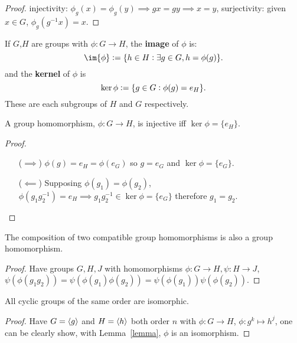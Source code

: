 \documentclass[../Year1.tex]{subfiles}
\begin{document}
\begin{proof}
    injectivity: $\phi_g(x)=\phi_g(y)\implies gx=gy \implies x=y$, \qquad surjectivity: given $x\in G$, $\phi_g(g^{-1}x)=x$.
\end{proof}

\begin{definition}
    If $G$,$H$ are groups with $\phi:G\rightarrow H$, the \textbf{image} of $\phi$ is: \[
        \im{\phi} := \{h\in H:\exists g\in G, h = \phi(g)\}
    \textcolor{black}{.}
    \] and the \textbf{kernel} of $\phi$ is \[
        \ker{\phi} := \{g\in G: \phi(g)=e_H\}
    \textcolor{black}{.}
    \]
    These are each subgroups of $H$ and $G$ respectively.
\end{definition}

\begin{lemma}
    A group homomorphism, $\phi:G\rightarrow H$, is injective iff $\ker\phi=\{e_H\}$.
\end{lemma}

\begin{proof}
    \begin{itemize}
        \item[($\implies$)]$\phi(g)=e_H=\phi(e_G)$ so $g=e_G$ and $\ker\phi=\{e_G\}$.
        \item[($\impliedby$)] Supposing $\phi(g_1)=\phi(g_2)$, $\phi(g_1g_2^{-1})=e_H\implies g_1g_2^{-1}\in\ker\phi = \{e_G\}$ therefore $g_1=g_2$. \vspace{-15pt}
    \end{itemize}
\end{proof}

\begin{theorem}
    The composition of two compatible group homomorphisms is also a group homomorphism.
\end{theorem}

\begin{proof}
    Have groups $G,H,J$ with homomorphisms $\phi:G\rightarrow H, \psi:H\rightarrow J$, $\psi(\phi(g_1g_2))=\psi(\phi(g_1)\phi(g_2))=\psi(\phi(g_1))\psi(\phi(g_2))$.
\end{proof}

\begin{theorem}
    All cyclic groups of the same order are isomorphic.
\end{theorem}

\begin{proof}
    Have $G=\left\langle g \right\rangle$ and $H=\left\langle h \right\rangle$ both order $n$ with $\phi:G\rightarrow H$, $\phi:g^k\mapsto h^j$, one can be clearly show, with Lemma~\ref{lemma}, $\phi$ is an isomorphism.
\end{proof}
\end{document}

